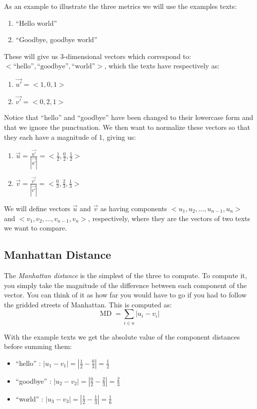 As an example to illustrate the three metrics we will use the examples texts:
\begin{enumerate}
  \item ``Hello world''
  \item ``Goodbye, goodbye world''
\end{enumerate}
These will give us 3-dimensional vectors which correspond to:
$< \text{``hello''}, \text{``goodbye''},
\text{``world''} >$, which the texts have respectively as:
\begin{enumerate}
  \item $\vec{u'} = <1, 0, 1>$
  \item $\vec{v'} = <0, 2, 1>$
\end{enumerate}
Notice that ``hello'' and ``goodbye'' have been changed to their lowercase form and
that we ignore the punctuation.
We then want to normalize these vectors so that they each have a magnitude of 1,
giving us:
\begin{enumerate}
  \item $\vec{u} = \frac{\vec{u'}}{|\vec{u'}|} = <\frac{1}{2}, \frac{0}{2}, \frac{1}{2}>$
  \item $\vec{v} = \frac{\vec{v'}}{|\vec{v'}|} = <\frac{0}{3}, \frac{2}{3}, \frac{1}{3}>$
\end{enumerate}
We will define vectors $\vec{u}$ and $\vec{v}$ as having components
$<u_1,u_2, \ldots, u_{n-1}, u_n>$ and
$<v_1,v_2, \ldots, v_{n-1}, v_n>$,
respectively, where they are the vectors of two texts we want to compare.

\subsection{Manhattan Distance}

The \emph{Manhattan distance} is the simplest of the three to compute. To
compute it, you simply take the magnitude of the difference between each
component of the vector. You can think of it as how far you would have to go if
you had to follow the gridded streets of Manhattan. This is computed as:
\[
  \operatorname{MD} = \displaystyle\sum_{i\in n} | u_i - v_i |
\]

\noindent With the example texts we get the absolute value of the component
distances before summing them:

\begin{itemize}
  \item ``hello'' : $|u_1 - v_1| = |\frac12 - \frac03| = \frac12$
  \item ``goodbye'' : $|u_2 - v_2| = |\frac02 - \frac23| = \frac23$
  \item ``world'' : $|u_3 - v_3| = |\frac12 - \frac13| = \frac1{6}$
\end{itemize}

